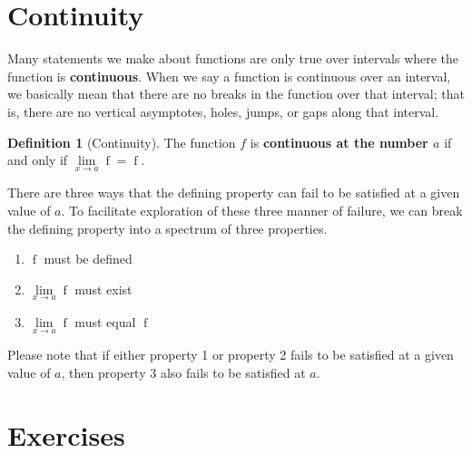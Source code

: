 \documentclass[12pt,]{book}
\newcommand{\terminology}[1]{\textbf{#1}}
\theoremstyle{plain}
\theoremstyle{definition}
\newtheorem{definition}[theorem]{Definition}
\numberwithin{equation}{section}
\newcommand{\fe}[2]{\mathop{{#1}{\left(#2\right)}}}
\begin{document}
\section[Continuity]{Continuity}\label{section-continuity}
Many statements we make about functions are only true over intervals where the function is \terminology{continuous}. When we say a function is continuous over an interval, we basically mean that there are no breaks in the function over that interval; that is, there are no vertical asymptotes, holes, jumps, or gaps along that interval.%
\begin{definition}[Continuity]\label{definition-continuity}
The function \(f\) is \terminology{continuous at the number \(a\)} if and only if \(\lim\limits_{x\to a}\fe{f}{x}=\fe{f}{a}\).%
\par
There are three ways that the defining property can fail to be satisfied at a given value of \(a\). To facilitate exploration of these three manner of failure, we can break the defining property into a spectrum of three properties.%
\begin{multicols}{3}
\begin{enumerate}
\item{}\(\fe{f}{a}\) must be defined\item{}\(\lim\limits_{x\to a}\fe{f}{x}\) must exist\item{}\(\lim\limits_{x\to a}\fe{f}{x}\) must equal \(\fe{f}{a}\)\end{enumerate}
\end{multicols}
\par
Please note that if either property 1 or property 2 fails to be satisfied at a given value of \(a\), then property 3 also fails to be satisfied at \(a\).%
\end{definition}
\typeout{************************************************}
\typeout{************************************************}
\section*{Exercises}\label{exercises-12}
\end{document}

